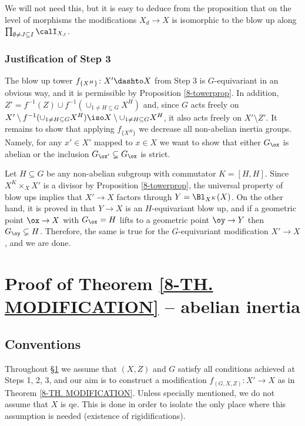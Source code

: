 \documentclass[10pt]{../fichiers-configuration-latex/smfart}
\begin{document}
\begin{remark2} We will not need this, but it is easy to deduce from
the proposition that on the level of morphisms the modifications
$X_d\to X$ is isomorphic to the blow up along $\prod_{\emptyset\neq
J\subseteq I}\calI_{X_J}$.  \end{remark2}

\subsubsection{Justification of Step 3}\label{8-step3sec} The
blow up tower $f_{\{X^H\}}{\colon}X'\dashto X$ from Step 3 is
$G$-equivariant in an obvious way, and it is permissible by
Proposition \ref{8-towerprop}. In addition, $Z'=f^{-1}(Z)\cup
f^{-1}(\cup_{1\neq H\subseteq G} X^H)$ and, since $G$ acts freely
on $X'\setminus f^{-1}(\cup_{1\neq H\subseteq G} X^H)\iso
X\setminus\cup_{1\neq H\subseteq G}X^H$, it also acts freely on
$X'\setminus Z'$. It remains to show that applying $f_{\{X^H\}}$ we
decrease all non-abelian inertia groups. Namely, for any $x'\in X'$
mapped to $x\in X$ we want to show that either $G_\ox$ is abelian
or the inclusion $G_{\ox'}\subsetneq G_\ox$ is strict.

Let $H\subseteq G$ be any non-abelian subgroup with commutator
$K=[H,H]$. Since $X^K\times_XX'$ is a divisor by Proposition
\ref{8-towerprop}, the universal property of blow ups implies that
$X'\to X$ factors through $Y=\Bl_{X^K}(X)$. On the other hand, it
is proved in  that $Y\to X$ is an $H$-equivariant
blow up, and if a geometric point $\ox\to X$ with $G_\ox=H$ lifts to
a geometric point $\oy\to Y$ then $G_\oy\subsetneq H$. Therefore,
the same is true for the $G$-equivariant modification $X'\to X$,
and we are done.

\section{Proof of Theorem \ref{8-TH. MODIFICATION} -- abelian
inertia}\label{8-endsec}

\subsection{Conventions}\label{8-notationendsec} Throughout
\S\ref{8-endsec} we assume that $(X,Z)$ and $G$ satisfy
all conditions achieved at Steps 1, 2, 3, and our aim is to
construct a modification $f_{(G,X,Z)}{\colon}X'\to X$ as in Theorem
\ref{8-TH. MODIFICATION}. Unless specially mentioned, we do not assume 
that $X$ is qe. This is done in order to isolate the only place where
this assumption is needed (existence of rigidifications).
\end{document}
